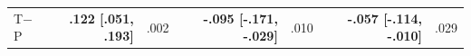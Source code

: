 \documentclass[letterpaper]{article} %
\begin{document}
\begin{table}[t!]
\begin{tabular}{@{}l rr rr rr@{}}
T$-$P & \textbf{.122 [.051, .193]} & .002 & \textbf{-.095 [-.171, -.029]} & .010 & \textbf{-.057 [-.114, -.010]} & .029\\ %

\end{tabular}
\end{table}
\end{document}
